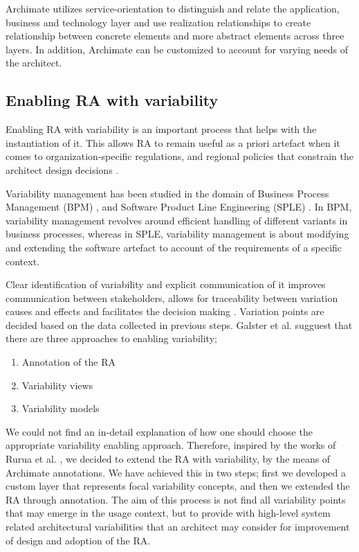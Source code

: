 \documentclass{bmcart}
\begin{document}
Archimate utilizes service-orientation to distinguish and relate the application, business and technology layer and use realization relationships to create relationship between concrete elements and more abstract elements across three layers. In addition, Archimate can be customized to account for varying needs of the architect.

\subsection{Enabling RA with variability}

Enabling RA with variability is an important process that helps with the instantiation of it.
This allows RA to remain useful as a priori artefact when it comes to organization-specific regulations, and regional policies that constrain the architect design decisions \cite{rurua2019representing}.

Variability management has been studied in the domain of Business Process Management (BPM) \cite{la2009questionnaire,rosemann2007configurable,hallerbach2010capturing}, and Software Product Line Engineering (SPLE) \cite{pohl2005software,chen2011systematic,schmid2004customizable,svahnberg2005taxonomy,sinnema2006covamof}. In BPM, variability management revolves around efficient handling of different variants in business processes, whereas in SPLE, variability management is about modifying and extending the software artefact to account of the requirements of a specific context.

Clear identification of variability and explicit communication of it improves communication between stakeholders, allows for traceability between variation causes and effects and facilitates the decision making \cite{czarnecki2012cool}. Variation points are decided based on the data collected in previous steps. Galster et al. \cite{galster2011empirically} sugguest that there are three approaches to enabling variability;

\begin{enumerate}
    \item Annotation of the RA
    \item Variability views
    \item Variability models
\end{enumerate}

We could not find an in-detail explanation of how one should choose the appropriate variability enabling approach. Therefore, inspired by the works of Rurua et al. \cite{rurua2019representing}, we decided to extend the RA with variability, by the means of Archimate annotations. We have achieved this in two steps; first we developed a custom layer that represents focal variability concepts, and then we extended the RA through annotation. The aim of this process is not find all variability points that may emerge in the usage context, but to provide with high-level system related architectural variabilities that an architect may consider for improvement of design and adoption of the RA.
\end{document}
